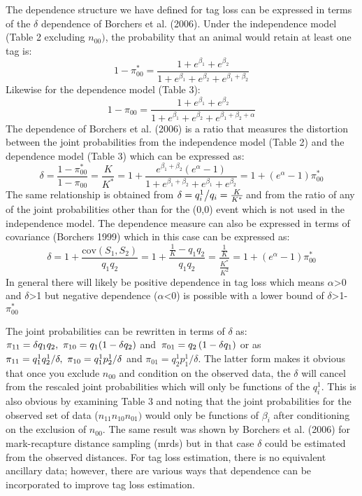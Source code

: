 \documentclass{article}
\begin{document}
The dependence structure we have defined for tag loss can be expressed in 
terms of the $\delta $ dependence of Borchers et al. (2006). Under the 
independence model (Table 2 excluding $n_{00})$, the probability that an 
animal would retain at least one tag is:
\[
1-\pi_{00}^{\ast }=\frac{1+e^{\beta_{1}}+e^{\beta_{2}}}{1+e^{\beta 
_{1}}+e^{\beta_{2}}+e^{\beta_{1}+\beta_{2}}}
\]
Likewise for the dependence model (Table 3):
\[
1-\pi_{00}=\frac{1+e^{\beta_{1}}+e^{\beta_{2}}}{1+e^{\beta_{1}}+e^{\beta 
_{2}}+e^{\beta_{1}+\beta_{2}+\alpha }}
\]
The dependence of Borchers et al. (2006) is a ratio that measures the 
distortion between the joint probabilities from the independence model 
(Table 2) and the dependence model (Table 3) which can be expressed as:
\[
\delta =\frac{1-\pi_{00}^{\ast }}{1-\pi_{00}}=\frac{K}{K^{\ast 
}}=1+\frac{e^{\beta_{1}+\beta_{2}}(e^{\alpha }-1)}{1+e^{\beta_{1}+\beta 
_{2}}+e^{\beta_{1}}+e^{\beta_{2}}}=1+(e^{\alpha }-1)\pi_{00}^{\ast }
\]
The same relationship is obtained from $\delta =q_{i}^{1} \mathord{\left/ 
{\vphantom {q_{i}^{1} q_{i}}} \right. \kern-\nulldelimiterspace} 
q_{i}=\frac{K}{K^{\ast }}\thinspace $and from the ratio of any of the joint 
probabilities other than for the (0,0) event which is not used in the 
independence model. The dependence measure can also be expressed in terms of 
covariance (Borchers 1999) which in this case can be expressed as:
\[
\delta 
=1+\frac{\mathrm{cov}(S_{1},S_{2})}{q_{1}q_{2}}=1+\frac{\frac{1}{K}-q_{1}q_{2}}{q_{1}q_{2}}=\frac{\frac{1}{K}}{\frac{K^{\ast 
}}{K^{2}}}=1+(e^{\alpha }-1)\pi_{00}^{\ast }
\]
In general there will likely be positive dependence in tag loss which means 
$\alpha $\textgreater 0 and $\delta $\textgreater 1 but negative dependence 
($\alpha $\textless 0) is possible with a lower bound of $\delta 
$\textgreater 1-$\pi_{00}^{\ast }$

The joint probabilities can be rewritten in terms of $\delta $ as: $\pi 
_{11}=\delta q_{1}q_{2},\thinspace \thinspace \pi_{10}=q_{1}(1-\delta 
q_{2})$ and $\thinspace \pi_{01}=q_{2}\left( 1-\delta q_{1} \right)$ or as 
$\pi_{11}=q_{1}^{1}q_{2}^{1}/\delta ,\thinspace \thinspace \pi 
_{10}=q_{1}^{1}p_{2}^{1}/\delta $ and $\pi_{01}=q_{2}^{1}p_{1}^{1}/\delta 
$. The latter form makes it obvious that once you exclude $n_{00}$ and 
condition on the observed data, the $\delta $ will cancel from the rescaled 
joint probabilities which will only be functions of the $q_{i}^{1}$. This is 
also obvious by examining Table 3 and noting that the joint probabilities 
for the observed set of data ($n_{11}n_{10}n_{01})$ would only be functions 
of $\beta_{i}$ after conditioning on the exclusion of $n_{00}$. The same 
result was shown by Borchers et al. (2006) for mark-recapture distance 
sampling (mrds) but in that case $\delta $ could be estimated from the 
observed distances. For tag loss estimation, there is no equivalent 
ancillary data; however, there are various ways that dependence can be 
incorporated to improve tag loss estimation. 
\end{document}
